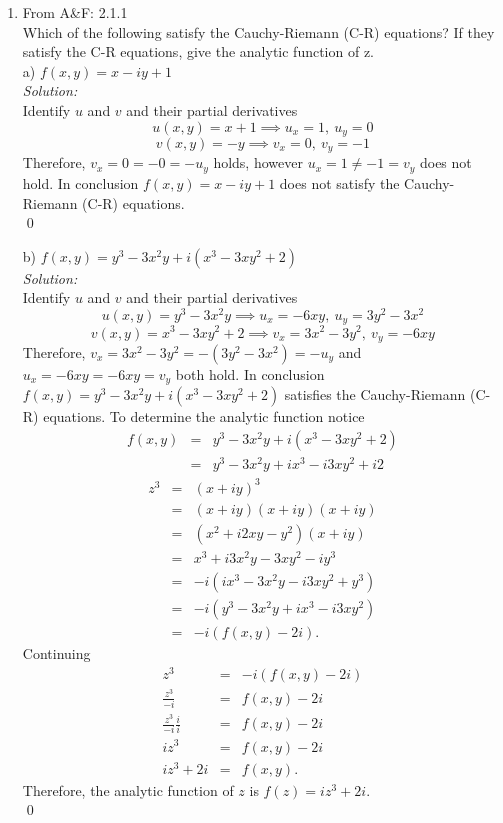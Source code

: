 \documentclass[10pt]{amsart}
\theoremstyle{nonumberplain}
\begin{document}
\begin{enumerate}[label={\bf {\arabic*}:}]
\item From A\&F: 2.1.1 \\
Which of the following satisfy the Cauchy-Riemann (C-R) equations? If they satisfy the C-R equations, give the analytic function of z. \\
a) $f(x, y) = x - iy + 1$ \\
\textit{Solution:} \\
Identify $u$ and $v$ and their partial derivatives
$$ u(x,y) = x + 1 \implies u_x = 1, \: u_y = 0$$
$$v(x,y) = - y \implies v_x = 0, \: v_y = -1$$
Therefore, $v_x = 0 = - 0 = - u_y$ holds, however $u_x = 1 \neq - 1 = v_y$ does not hold.
In conclusion $f(x, y) = x - iy + 1$ does not satisfy the Cauchy-Riemann (C-R) equations.\\
\qed

\noindent
b) $f(x, y) = y^3 - 3x^2y + i(x^3 - 3xy^2 + 2)$ \\
\textit{Solution:} \\
Identify $u$ and $v$ and their partial derivatives
$$ u(x,y) = y^3 - 3x^2y \implies u_x = -6xy, \: u_y = 3y^2 -3x^2$$
$$v(x,y) = x^3 - 3xy^2 + 2 \implies v_x = 3x^2 - 3y^2, \: v_y = -6xy$$
Therefore, $v_x = 3x^2 - 3y^2 = - (3y^2 -3x^2) = - u_y$ and $u_x = -6xy = -6xy = v_y$ both hold.
In conclusion $f(x, y) = y^3 - 3x^2y + i(x^3 - 3xy^2 + 2)$ satisfies the Cauchy-Riemann (C-R) equations.
To determine the analytic function notice
\begin{eqnarray*}
f(x, y) &=& y^3 - 3x^2y + i(x^3 - 3xy^2 + 2) \\
	 &=& y^3 - 3x^2y + ix^3 - i3xy^2 + i2
\end{eqnarray*}
\begin{eqnarray*}
z^3 &=& (x + iy)^3 \\
      &=& (x + iy)(x + iy)(x + iy) \\
      &=& (x^2 + i2xy - y^2)(x + iy) \\
      &=& x^3 + i3x^2y - 3xy^2 - iy^3 \\
      &=& -i(ix^3 - 3x^2y - i3xy^2 + y^3) \\
      &=& -i(y^3 - 3x^2y + ix^3 - i3xy^2) \\
      &=& -i(f(x,y) - 2i).
\end{eqnarray*}
Continuing
\begin{eqnarray*}
z^3 &=& -i(f(x,y) - 2i) \\
\frac{z^3}{-i} &=& f(x,y) - 2i \\
\frac{z^3}{-i}\frac{i}{i} &=& f(x,y) - 2i \\
iz^3 &=& f(x,y) - 2i \\
iz^3 + 2i &=& f(x,y).
\end{eqnarray*}
Therefore, the analytic function of $z$ is $f(z) = iz^3 + 2i$. \\
\qed


\end{enumerate}
\end{document}
